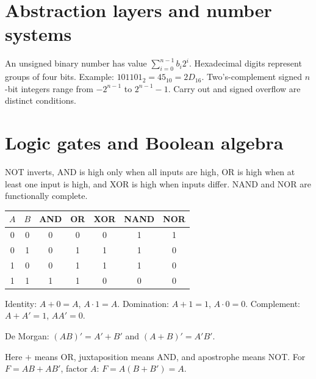 \documentclass[11pt,a4paper]{article}
\begin{document}
\section{Abstraction layers and number systems}
\begin{center}\end{center}
An unsigned binary number has value $\sum_{i=0}^{n-1}b_i2^i$. Hexadecimal digits represent groups of four bits. Example: $101101_2=45_{10}=2D_{16}$. Two's-complement signed $n$-bit integers range from $-2^{n-1}$ to $2^{n-1}-1$. Carry out and signed overflow are distinct conditions.
\section{Logic gates and Boolean algebra}
NOT inverts, AND is high only when all inputs are high, OR is high when at least one input is high, and XOR is high when inputs differ. NAND and NOR are functionally complete.
\begin{center}\begin{tabular}{cc|ccccc}\toprule $A$&$B$&AND&OR&XOR&NAND&NOR\\\midrule 0&0&0&0&0&1&1\\0&1&0&1&1&1&0\\1&0&0&1&1&1&0\\1&1&1&1&0&0&0\\\bottomrule\end{tabular}\end{center}
\begin{formulaBox}
Identity: $A+0=A$, $A\cdot1=A$. Domination: $A+1=1$, $A\cdot0=0$. Complement: $A+A'=1$, $AA'=0$.\par
De Morgan: $(AB)'=A'+B'$ and $(A+B)'=A'B'$.
\end{formulaBox}
Here $+$ means OR, juxtaposition means AND, and apostrophe means NOT. For $F=AB+AB'$, factor $A$: $F=A(B+B')=A$.
\end{document}
